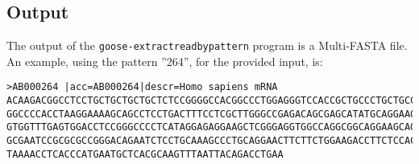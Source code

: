 \subsection*{Output}
The output of the \texttt{goose-extractreadbypattern} program is a Multi-FASTA file.\\
An example, using the pattern ''264'', for the provided input, is:
\begin{lstlisting}
>AB000264 |acc=AB000264|descr=Homo sapiens mRNA 
ACAAGACGGCCTCCTGCTGCTGCTGCTCTCCGGGGCCACGGCCCTGGAGGGTCCACCGCTGCCCTGCTGCCATTGTCCCC
GGCCCCACCTAAGGAAAAGCAGCCTCCTGACTTTCCTCGCTTGGGCCGAGACAGCGAGCATATGCAGGAAGCGGCAGGAA
GTGGTTTGAGTGGACCTCCGGGCCCCTCATAGGAGAGGAAGCTCGGGAGGTGGCCAGGCGGCAGGAAGCAGGCCAGTGCC
GCGAATCCGCGCGCCGGGACAGAATCTCCTGCAAAGCCCTGCAGGAACTTCTTCTGGAAGACCTTCTCCACCCCCCCAGC
TAAAACCTCACCCATGAATGCTCACGCAAGTTTAATTACAGACCTGAA
\end{lstlisting}
